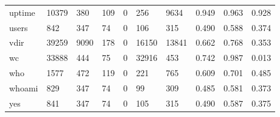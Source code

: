 \begin{longtable}{lp{1.3cm}p{1.3cm}p{1.3cm}p{1.3cm}p{1.3cm}p{1.3cm}p{1.3cm}p{1.3cm}p{1.3cm}}
uptime    &                  10379 &                                380 &                               109 &                                0 &                               256 &                            9634 &                                   0.949 &                                  0.963 &                                0.928 \\
users     &                    842 &                                347 &                                74 &                                0 &                               106 &                             315 &                                   0.490 &                                  0.588 &                                0.374 \\
vdir      &                  39259 &                               9090 &                               178 &                                0 &                             16150 &                           13841 &                                   0.662 &                                  0.768 &                                0.353 \\
wc        &                  33888 &                                444 &                                75 &                                0 &                             32916 &                             453 &                                   0.742 &                                  0.987 &                                0.013 \\
who       &                   1577 &                                472 &                               119 &                                0 &                               221 &                             765 &                                   0.609 &                                  0.701 &                                0.485 \\
whoami    &                    829 &                                347 &                                74 &                                0 &                                99 &                             309 &                                   0.485 &                                  0.581 &                                0.373 \\
yes       &                    841 &                                347 &                                74 &                                0 &                               105 &                             315 &                                   0.490 &                                  0.587 &                                0.375 \\
\end{longtable}
